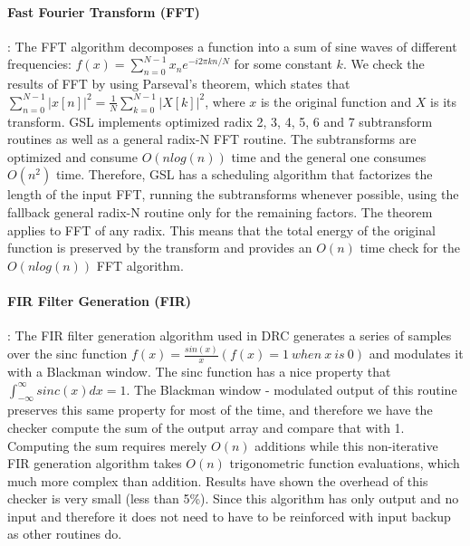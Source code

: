 \documentclass{sig-alternate}
\begin{document}
\paragraph{Fast Fourier Transform (FFT)}:
The FFT algorithm decomposes a function into a sum of sine waves of different frequencies: $f(x) = \sum_{n=0}^{N-1} x_n e^{-i2\pi k n / N}$ for some constant $k$.
We check the results of FFT by using Parseval's theorem, which states that $\sum_{n=0}^{N-1} \left| x[n] \right|^2 = \frac{1}{N} \sum_{k=0}^{N-1} \left| X[k] \right|^2$, where $x$ is the original function and $X$ is its transform. GSL implements optimized radix 2, 3, 4, 5, 6 and 7 subtransform routines as well as a general radix-N FFT routine. The subtransforms are optimized and consume $O(n log(n))$ time and the general one consumes $O(n^2)$ time. Therefore, GSL has a scheduling algorithm that factorizes the length of the input FFT, running the subtransforms whenever possible, using the fallback general radix-N routine only for the remaining factors.
The theorem applies to FFT of any radix.
This means that the total energy of the original function is preserved by the transform and provides an $O(n)$ time check for the $O(n log(n))$ FFT algorithm.

\paragraph{FIR Filter Generation (FIR)}:
The FIR filter generation algorithm used in DRC generates a series of samples over the sinc function $f(x)=\frac{sin(x)}{x} (f(x)=1\ when\ x\ is\ 0)$ and modulates it with a Blackman window.
The sinc function has a nice property that $\int_{-\infty}^{\infty} sinc(x)dx = 1$. The Blackman window - modulated output of this routine
preserves this same property for most of the time, and therefore we have the checker compute the sum of the output array and compare that with 1.
Computing the sum requires merely $O(n)$ additions while this non-iterative FIR generation algorithm takes $O(n)$ trigonometric function evaluations, which much more complex than addition. Results have shown
the overhead of this checker is very small (less than 5\%).
Since this algorithm has only output and no input and therefore it does not need to have to be reinforced with input backup as other routines do.
\end{document}
